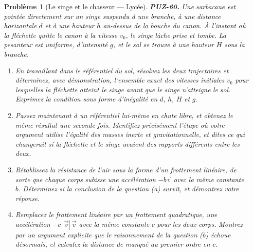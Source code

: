 \documentclass[11pt]{article}
\newtheorem{problem}{Problème}
\begin{document}
\begin{problem}[{Le singe et le chasseur --- Lycée}]
\textbf{PUZ-60.} Une sarbacane est pointée \textit{directement} sur un singe suspendu à une
branche, à une distance horizontale $ d $ et à une hauteur $ h $ au-dessus de la bouche
du canon. À l'instant où la fléchette quitte le canon à la vitesse $ v_0 $, le singe lâche
prise et tombe. La pesanteur est uniforme, d'intensité $ g $, et le sol se trouve à une
hauteur $ H $ sous la branche.
\begin{enumerate}
\item[(a)] En travaillant dans le référentiel du sol, résolvez les deux trajectoires et déterminez,
avec démonstration, l'ensemble exact des vitesses initiales $ v_0 $ pour lesquelles la
fléchette atteint le singe avant que le singe n'atteigne le sol. Exprimez la condition sous
forme d'inégalité en $ d $, $ h $, $ H $ et $ g $.
\item[(b)] Passez maintenant à un référentiel lui-même en chute libre, et obtenez le même résultat
une seconde fois. Identifiez précisément l'étape où votre argument utilise l'égalité des
masses inerte et gravitationnelle, et dites ce qui changerait si la fléchette et le singe
avaient des rapports différents entre les deux.
\item[(c)] Rétablissez la résistance de l'air sous la forme d'un frottement linéaire, de sorte que
chaque corps subisse une accélération $ -b\vec{v} $ avec la même constante $ b $.
Déterminez si la conclusion de la question (a) survit, et démontrez votre réponse.
\item[(d)] Remplacez le frottement linéaire par un frottement quadratique, une accélération
$ -c\,|\vec{v}|\,\vec{v} $ avec la même constante $ c $ pour les deux corps. Montrez par
un argument explicite que le raisonnement de la question (b) échoue désormais, et calculez
la distance de manqué au premier ordre en $ c $.
\end{enumerate}

\end{problem}
\end{document}
